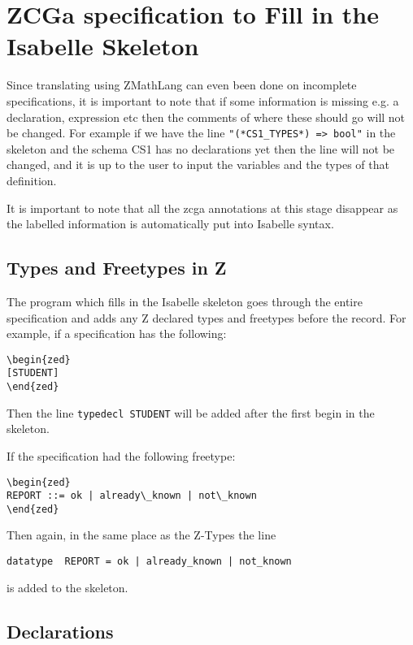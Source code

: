 \section{ZCGa specification to Fill in the Isabelle Skeleton}
\label{sec:zcga2fillin}

Since translating using ZMathLang can even been done on incomplete specifications, it is important to
note that if some information is missing e.g. a declaration, expression
etc then the comments of where these should go will not be changed. For example
if we have the line \verb|"(*CS1_TYPES*) => bool"| in the skeleton and the
schema CS1 has no declarations yet then the line will not be changed, and it is
up to the user to input the variables and the types of that definition.

It is important to note that all the \gls{zcga} annotations at this stage
disappear as the labelled information is automatically put into Isabelle syntax.

\subsection{Types and Freetypes in Z}

The program which fills in the Isabelle skeleton goes through the entire
specification and adds any Z declared types and freetypes before the record. For
example, if a specification has the following:
\begin{verbatim}
\begin{zed}
[STUDENT]
\end{zed}
\end{verbatim}

Then the line \verb|typedecl STUDENT| will be added after the first begin in the
skeleton.

If the specification had the following freetype:
\begin{verbatim}
\begin{zed} 
REPORT ::= ok | already\_known | not\_known
\end{zed}
\end{verbatim}

Then again, in the same place as the Z-Types the line
\begin{verbatim}
datatype  REPORT = ok | already_known | not_known
\end{verbatim}
is added to the skeleton.

\subsection{Declarations}

